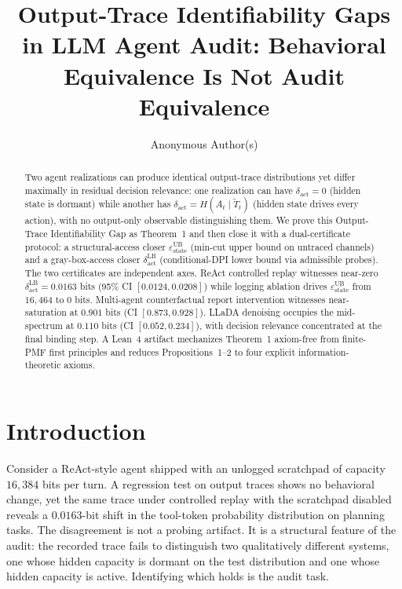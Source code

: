 \documentclass{article}
\title{Output-Trace Identifiability Gaps in LLM Agent Audit: Behavioral Equivalence Is Not Audit Equivalence}
\author{
  Anonymous Author(s) \\
}
\begin{document}
\maketitle

\begin{abstract}
Two agent realizations can produce identical output-trace distributions yet differ maximally in residual decision relevance: one realization can have $\delta_\text{act}=0$ (hidden state is dormant) while another has $\delta_\text{act}=H(A_t\mid\tilde T_t)$ (hidden state drives every action), with no output-only observable distinguishing them. We prove this Output-Trace Identifiability Gap as Theorem~1 and then close it with a dual-certificate protocol: a structural-access closer $\varepsilon_\text{state}^\text{UB}$ (min-cut upper bound on untraced channels) and a gray-box-access closer $\delta_\text{act}^\text{LB}$ (conditional-DPI lower bound via admissible probes). The two certificates are independent axes. ReAct controlled replay witnesses near-zero $\delta_\text{act}^\text{LB}=0.0163$ bits (95\% CI $[0.0124,0.0208]$) while logging ablation drives $\varepsilon_\text{state}^\text{UB}$ from $16{,}464$ to $0$ bits. Multi-agent counterfactual report intervention witnesses near-saturation at $0.901$ bits (CI $[0.873,0.928]$). LLaDA denoising occupies the mid-spectrum at $0.110$ bits (CI $[0.052,0.234]$), with decision relevance concentrated at the final binding step. A Lean~4 artifact mechanizes Theorem~1 axiom-free from finite-PMF first principles and reduces Propositions~1--2 to four explicit information-theoretic axioms.
\end{abstract}

\section{Introduction}
\label{sec:introduction}

Consider a ReAct-style agent shipped with an unlogged scratchpad of capacity $16{,}384$ bits per turn. A regression test on output traces shows no behavioral change, yet the same trace under controlled replay with the scratchpad disabled reveals a $0.0163$-bit shift in the tool-token probability distribution on planning tasks. The disagreement is not a probing artifact. It is a structural feature of the audit: the recorded trace fails to distinguish two qualitatively different systems, one whose hidden capacity is dormant on the test distribution and one whose hidden capacity is active. Identifying which holds is the audit task.
\end{document}
